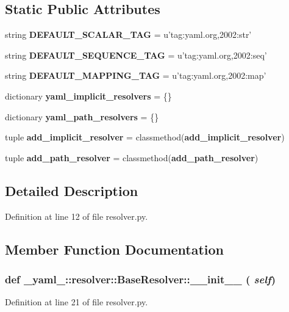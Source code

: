 \subsection*{Static Public Attributes}
\begin{CompactItemize}
\item 
string {\bf DEFAULT\_\-SCALAR\_\-TAG} = u'tag:yaml.org,2002:str'
\item 
string {\bf DEFAULT\_\-SEQUENCE\_\-TAG} = u'tag:yaml.org,2002:seq'
\item 
string {\bf DEFAULT\_\-MAPPING\_\-TAG} = u'tag:yaml.org,2002:map'
\item 
dictionary {\bf yaml\_\-implicit\_\-resolvers} = \{\}
\item 
dictionary {\bf yaml\_\-path\_\-resolvers} = \{\}
\item 
tuple {\bf add\_\-implicit\_\-resolver} = classmethod({\bf add\_\-implicit\_\-resolver})
\item 
tuple {\bf add\_\-path\_\-resolver} = classmethod({\bf add\_\-path\_\-resolver})
\end{CompactItemize}


\subsection{Detailed Description}


Definition at line 12 of file resolver.py.

\subsection{Member Function Documentation}
\subsubsection{\setlength{\rightskip}{0pt plus 5cm}def \_\-yaml\_\-::resolver::BaseResolver::\_\-\_\-init\_\-\_\- ( {\em self})}\label{class__yaml___1_1resolver_1_1BaseResolver_b4cf580f507c870ba572413b41db7e3e}




Definition at line 21 of file resolver.py.

